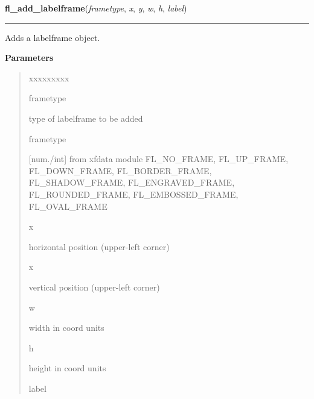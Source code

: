     \label{xformslib:library:fl_add_labelframe}

    \vspace{0.5ex}

\hspace{.8\funcindent}\begin{boxedminipage}{\funcwidth}

    \raggedright \textbf{fl\_add\_labelframe}(\textit{frametype}, \textit{x}, \textit{y}, \textit{w}, \textit{h}, \textit{label})

    \vspace{-1.5ex}

    \rule{\textwidth}{0.5\fboxrule}
\setlength{\parskip}{2ex}
    Adds a labelframe object.

\setlength{\parskip}{1ex}
      \textbf{Parameters}
      \vspace{-1ex}

      \begin{quote}
        \begin{Ventry}{xxxxxxxxx}

          \item[frametype]

          type of labelframe to be added

          \item[frametype]

          [num./int] from xfdata module FL\_NO\_FRAME, FL\_UP\_FRAME, 
          FL\_DOWN\_FRAME, FL\_BORDER\_FRAME, FL\_SHADOW\_FRAME, 
          FL\_ENGRAVED\_FRAME, FL\_ROUNDED\_FRAME, FL\_EMBOSSED\_FRAME, 
          FL\_OVAL\_FRAME

          \item[x]

          horizontal position (upper-left corner)

          \item[x]

          vertical position (upper-left corner)

          \item[w]

          width in coord units

          \item[h]

          height in coord units

          \item[label]


\end{Ventry}
\end{quote}
\end{boxedminipage}
